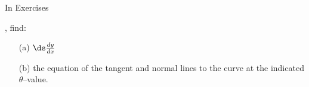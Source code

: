 {\noindent In Exercises}
{, find:
\begin{enumerate}
	\item [(a)]  $\ds \frac{dy}{dx}$
	\item [(b)]  the equation of the tangent and normal lines to the curve at the indicated $\theta$--value.
\end{enumerate}
}
